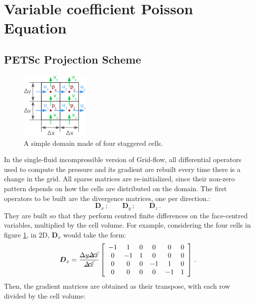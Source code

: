 \documentclass[11pt, a4paper, oneside, openany]{book}
\begin{document}
\section{Variable coefficient Poisson Equation}\label{Chapter_Implementation_Variable_Coefficient_Poisson_Equation}
\subsection{PETSc Projection Scheme}\label{Subsection_PETSc_projection_scheme}
\begin{figure}[!ht]
	\centering
	\includegraphics[width=0.3\textwidth]{StaggeredGrid4.pdf}
	\caption[Staggered Grid 4 cells]{A simple domain made of four staggered cells.}\label{StaggeredGrid4}
\end{figure}\noindent
In the single-fluid incompressible version of Grid-flow, all differential operators used to compute the pressure and its gradient are rebuilt every time there is a change in the grid. All sparse matrices are re-initialized, since their non-zero pattern depends on how the cells are distributed on the domain. 
The first operators to be built are the divergence matrices, one per direction.:
\begin{equation*}
\boldsymbol{D}_{x}\,;\qquad\boldsymbol{D}_{y}\,;\qquad\boldsymbol{D}_{z}\,.
\end{equation*}
They are built so that they perform centred finite differences on the face-centred variables, multiplied by the cell volume. For example, considering the four cells in figure \ref{StaggeredGrid4}, in 2D, $\boldsymbol{D}_{x}$ would take the form:
\begin{equation}
\boldsymbol{D}_{x}=\dfrac{\Delta y\cancel{\Delta x}}{\cancel{\Delta x}}\left[\begin{array}{cccccc}
-1 & 1 & 0 & 0 & 0 & 0\\
0 & -1 & 1 & 0 & 0 & 0\\
0 & 0 & 0 & -1 & 1 & 0\\
0 & 0 & 0 & 0 & -1 & 1
\end{array}\right]\,.
\end{equation}
Then, the gradient matrices are obtained as their transpose, with each row divided by the cell volume:
\end{document}
